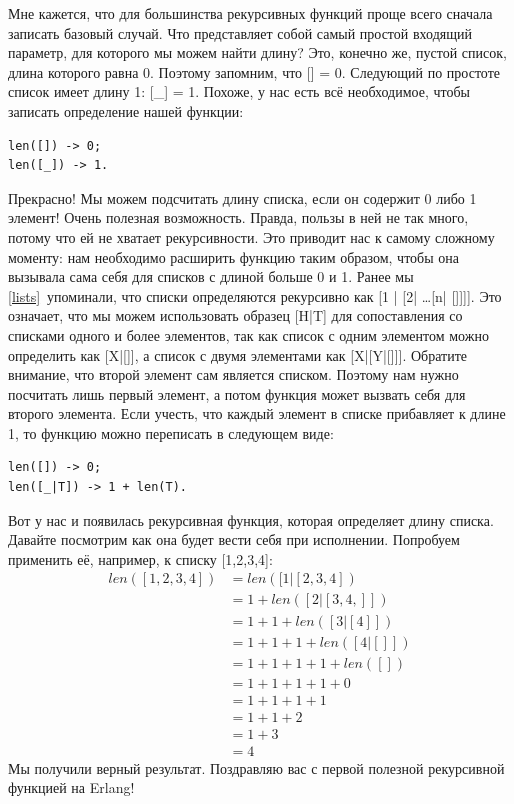 \documentclass[a4paper,12pt]{report}
\newcommand{\ops}{\colorbox{lgreen}}
\begin{document}
Мне кажется, что для большинства рекурсивных функций проще всего сначала записать базовый случай. Что представляет собой самый простой входящий параметр, для которого мы можем найти длину? Это, конечно же, пустой список, длина которого равна 0. Поэтому запомним, что \ops{[] = 0}. Следующий по простоте список имеет длину 1: \ops{[\_] = 1}. Похоже, у нас есть всё необходимое, чтобы записать определение нашей функции:
\begin{lstlisting}[style=erlang]
len([]) -> 0;
len([_]) -> 1.
\end{lstlisting}

Прекрасно! Мы можем подсчитать длину списка, если он содержит 0 либо 1 элемент! Очень полезная возможность. Правда, пользы в ней не так много, потому что ей не хватает рекурсивности. Это приводит нас к самому сложному моменту: нам необходимо расширить функцию таким образом, чтобы она вызывала сама себя для списков с длиной больше 0 и 1. Ранее мы \ref{lists}{~упоминали}, что списки определяются рекурсивно как \ops{[1 | [2| \ldots [n| []]]]}. Это означает, что мы можем использовать образец \ops{[H|T]} для сопоставления со списками одного и более элементов, так как список с одним элементом можно определить как \ops{[X|[]]}, а список с двумя элементами как \ops{[X|[Y|[]]]}. Обратите внимание, что второй элемент сам является списком. Поэтому нам нужно посчитать лишь первый элемент, а потом функция может вызвать себя для второго элемента. Если учесть, что каждый элемент в списке прибавляет к длине 1, то функцию можно переписать в следующем виде:
\begin{lstlisting}[style=erlang]
len([]) -> 0;
len([_|T]) -> 1 + len(T).
\end{lstlisting}

Вот у нас и появилась рекурсивная функция, которая определяет длину списка. Давайте посмотрим как она будет вести себя при исполнении. Попробуем применить её, например, к списку \ops{[1,2,3,4]}: \begin{align*}
len([1,2,3,4]) &= len([1 | [2,3,4])\\
&= 1 + len([2 | [3,4,]])\\
&= 1 + 1 + len([3 | [4]])\\
&= 1 + 1 + 1 + len([4 | []])\\
&= 1 + 1 + 1 + 1 + len([])\\
&= 1 + 1 + 1 + 1 + 0\\
&= 1 + 1 + 1 + 1\\
&= 1 + 1 + 2\\
&= 1 + 3\\
&= 4
\end{align*}
Мы получили верный результат. Поздравляю вас с первой полезной рекурсивной функцией на Erlang!
\end{document}
